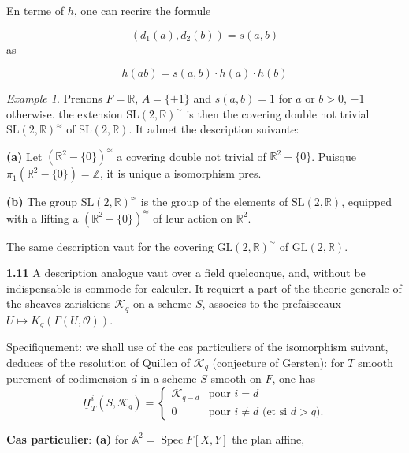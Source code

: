 \documentclass[12pt,a4paper]{article}
\theoremstyle{plain}
\theoremstyle{definition}
\theoremstyle{remark}
\newtheorem{example}[theorem]{Example}
\newcommand{\RR}{\mathbb{R}}
\newcommand{\ZZ}{\mathbb{Z}}
\newcommand{\cO}{\mathcal{O}}
\newcommand{\cK}{\mathcal{K}}
\providecommand{\AA}{\mathbb{A}}
\providecommand{\RR}{\mathbb{R}}
\providecommand{\ZZ}{\mathbb{Z}}
\providecommand{\cK}{\mathcal{K}}
\providecommand{\cO}{\mathcal{O}}
\providecommand{\Spec}{\operatorname{Spec}}
\begin{document}
En terme of $h$, one can recrire the formule

\begin{equation}\label{eq:1.9.4}
(d_1(a), d_2(b)) = s(a, b)
\tag{1.9.4}
\end{equation}
as

\begin{equation}\label{eq:1.9.5}
h(ab) = s(a, b) \cdot h(a) \cdot h(b)
\tag{1.9.5}
\end{equation}

\begin{example}
Prenons $F = \RR$, $A = \{\pm 1\}$ and $s(a, b) = 1$ for $a$ or $b > 0$, $-1$ otherwise. the extension $\mathrm{SL}(2, \RR)^\sim$ is then the covering double not trivial $\mathrm{SL}(2, \RR)^\approx$ of $\mathrm{SL}(2, \RR)$. It admet the description suivante:

\textbf{(a)} Let $(\RR^2 - \{0\})^\approx$ a covering double not trivial of $\RR^2 - \{0\}$. Puisque $\pi_1(\RR^2 - \{0\}) = \ZZ$, it is unique a isomorphism pres.

\textbf{(b)} The group $\mathrm{SL}(2, \RR)^\approx$ is the group of the elements of $\mathrm{SL}(2, \RR)$, equipped with a lifting a $(\RR^2 - \{0\})^\approx$ of leur action on $\RR^2$.

The same description vaut for the covering $\mathrm{GL}(2, \RR)^\sim$ of $\mathrm{GL}(2, \RR)$.
\end{example}

\textbf{1.11} A description analogue vaut over a field quelconque, and, without be indispensable is commode for calculer. It requiert a part of the theorie generale of the sheaves zariskiens $\cK_q$ on a scheme $S$, associes to the prefaisceaux $U \mapsto K_q(\Gamma(U, \cO))$.

Specifiquement: we shall use of the cas particuliers of the isomorphism suivant, deduces of the resolution of Quillen of $\cK_q$ (conjecture of Gersten): for $T$ smooth purement of codimension $d$ in a scheme $S$ smooth on $F$, one has
\begin{equation}\label{eq:1.11.1}
\underline{H}_T^i(S, \cK_q) = \begin{cases} \cK_{q-d} & \text{pour } i = d \\ 0 & \text{pour } i \neq d \text{ (et si } d > q\text{).} \end{cases}
\tag{1.11.1}
\end{equation}

\textbf{Cas particulier}: \textbf{(a)} for $\AA^2 = \Spec F[X, Y]$ the plan affine,
\end{document}
